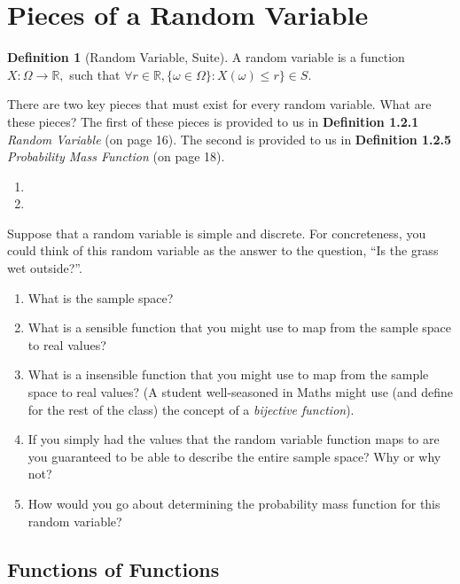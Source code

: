 \documentclass[
]{book}
\providecommand{\tightlist}{%
  \setlength{\itemsep}{0pt}\setlength{\parskip}{0pt}}
\theoremstyle{definition}
\newtheorem{definition}{Definition}[chapter]
\theoremstyle{definition}
\theoremstyle{definition}
\theoremstyle{definition}
\theoremstyle{remark}
\begin{document}
\section{Pieces of a Random Variable}\label{pieces-of-a-random-variable}

\begin{definition}[Random Variable, Suite]
A random variable is a function \(X : \Omega \rightarrow \mathbb{R},\) such that \(\forall r \in \mathbb{R}, \{\omega \in \Omega\}: X(\omega) \leq r\} \in S\).
\end{definition}

There are two key pieces that must exist for every random variable. What are these pieces? The first of these pieces is provided to us in \textbf{Definition 1.2.1} \emph{Random Variable} (on page 16). The second is provided to us in \textbf{Definition 1.2.5} \emph{Probability Mass Function} (on page 18).

\begin{enumerate}
\def\labelenumi{\arabic{enumi}.}
\tightlist
\item
\item
\end{enumerate}

Suppose that a random variable is simple and discrete. For concreteness, you could think of this random variable as the answer to the question, ``Is the grass wet outside?''.

\begin{enumerate}
\def\labelenumi{\arabic{enumi}.}
\tightlist
\item
  What is the sample space?
\item
  What is a sensible function that you might use to map from the sample space to real values?
\item
  What is a insensible function that you might use to map from the sample space to real values? (A student well-seasoned in Maths might use (and define for the rest of the class) the concept of a \emph{bijective function}).
\item
  If you simply had the values that the random variable function maps to are you guaranteed to be able to describe the entire sample space? Why or why not?
\item
  How would you go about determining the probability mass function for this random variable?
\end{enumerate}

\subsection{Functions of Functions}\label{functions-of-functions}
\end{document}
